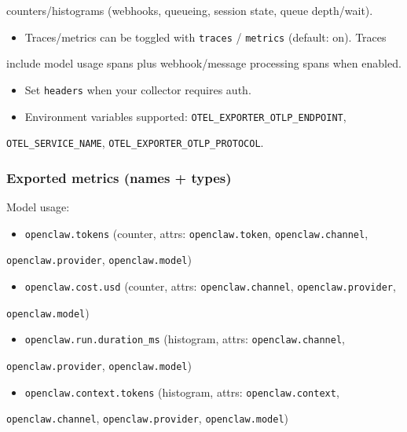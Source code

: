 counters/histograms (webhooks, queueing, session state, queue depth/wait).
\begin{itemize}
  \item Traces/metrics can be toggled with \texttt{traces} / \texttt{metrics} (default: on). Traces
\end{itemize}

include model usage spans plus webhook/message processing spans when enabled.
\begin{itemize}
  \item Set \texttt{headers} when your collector requires auth.
  \item Environment variables supported: \texttt{OTEL\_EXPORTER\_OTLP\_ENDPOINT},
\end{itemize}

\texttt{OTEL\_SERVICE\_NAME}, \texttt{OTEL\_EXPORTER\_OTLP\_PROTOCOL}.

\subsubsection{Exported metrics (names + types)}


Model usage:

\begin{itemize}
  \item \texttt{openclaw.tokens} (counter, attrs: \texttt{openclaw.token}, \texttt{openclaw.channel},
\end{itemize}

\texttt{openclaw.provider}, \texttt{openclaw.model})
\begin{itemize}
  \item \texttt{openclaw.cost.usd} (counter, attrs: \texttt{openclaw.channel}, \texttt{openclaw.provider},
\end{itemize}

\texttt{openclaw.model})
\begin{itemize}
  \item \texttt{openclaw.run.duration\_ms} (histogram, attrs: \texttt{openclaw.channel},
\end{itemize}

\texttt{openclaw.provider}, \texttt{openclaw.model})
\begin{itemize}
  \item \texttt{openclaw.context.tokens} (histogram, attrs: \texttt{openclaw.context},
\end{itemize}

\texttt{openclaw.channel}, \texttt{openclaw.provider}, \texttt{openclaw.model})

